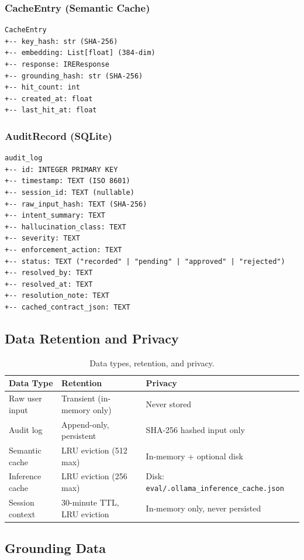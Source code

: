 ﻿\documentclass[10pt,journal,onecolumn]{IEEEtran}
\begin{document}
\subsubsection{CacheEntry (Semantic Cache)}
\begin{lstlisting}
CacheEntry
+-- key_hash: str (SHA-256)
+-- embedding: List[float] (384-dim)
+-- response: IREResponse
+-- grounding_hash: str (SHA-256)
+-- hit_count: int
+-- created_at: float
+-- last_hit_at: float
\end{lstlisting}

\subsubsection{AuditRecord (SQLite)}
\begin{lstlisting}
audit_log
+-- id: INTEGER PRIMARY KEY
+-- timestamp: TEXT (ISO 8601)
+-- session_id: TEXT (nullable)
+-- raw_input_hash: TEXT (SHA-256)
+-- intent_summary: TEXT
+-- hallucination_class: TEXT
+-- severity: TEXT
+-- enforcement_action: TEXT
+-- status: TEXT ("recorded" | "pending" | "approved" | "rejected")
+-- resolved_by: TEXT
+-- resolved_at: TEXT
+-- resolution_note: TEXT
+-- cached_contract_json: TEXT
\end{lstlisting}

\subsection{Data Retention and Privacy}
\begin{table}[t]
\caption{Data types, retention, and privacy.}
\label{tab:retention}
\begin{tabularx}{\textwidth}{l X X}
\toprule
\textbf{Data Type} & \textbf{Retention} & \textbf{Privacy}\\
\midrule
Raw user input & Transient (in-memory only) & Never stored\\
Audit log & Append-only, persistent & SHA-256 hashed input only\\
Semantic cache & LRU eviction (512 max) & In-memory + optional disk\\
Inference cache & LRU eviction (256 max) & Disk: \texttt{eval/.ollama\_inference\_cache.json}\\
Session context & 30-minute TTL, LRU eviction & In-memory only, never persisted\\
\bottomrule
\end{tabularx}
\end{table}

\subsection{Grounding Data}
\end{document}
